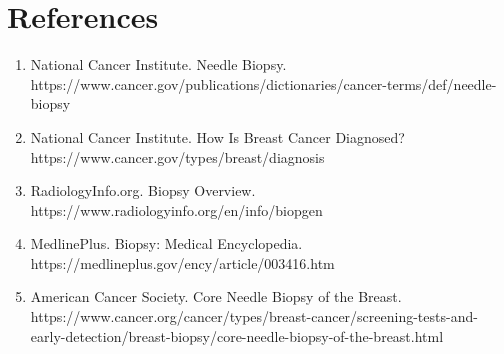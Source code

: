\section*{References}
\begin{enumerate}
  \item National Cancer Institute. Needle Biopsy. https://www.cancer.gov/publications/dictionaries/cancer-terms/def/needle-biopsy
  \item National Cancer Institute. How Is Breast Cancer Diagnosed? https://www.cancer.gov/types/breast/diagnosis
  \item RadiologyInfo.org. Biopsy Overview. https://www.radiologyinfo.org/en/info/biopgen
  \item MedlinePlus. Biopsy: Medical Encyclopedia. https://medlineplus.gov/ency/article/003416.htm
  \item American Cancer Society. Core Needle Biopsy of the Breast. https://www.cancer.org/cancer/types/breast-cancer/screening-tests-and-early-detection/breast-biopsy/core-needle-biopsy-of-the-breast.html
\end{enumerate}

\clearpage
